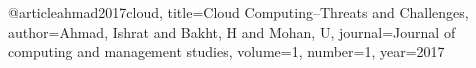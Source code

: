 







@article{ahmad2017cloud,
title={Cloud Computing--Threats and Challenges},
author={Ahmad, Ishrat and Bakht, H and Mohan, U},
journal={Journal of computing and management studies},
volume={1},
number={1},
year={2017}
}

